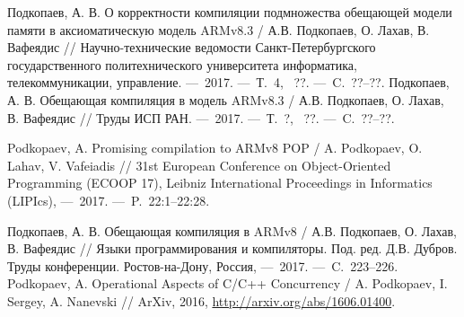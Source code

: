 \renewcommand{\refname}{Статьи из ``Перечня рецензируемых научных изданий, в которых должны быть опубликованы основные научные результаты диссертаций на соискание ученой степени кандидата наук, на соискание ученой степени доктора наук'', сформированного согласно требованиям, установленным Министерством образования и науки Российской Федерации}
\begin{thebibliography}{99}
 Подкопаев, А. В. О корректности компиляции подмножества обещающей модели памяти в аксиоматическую модель ARMv8.3 / А.В. Подкопаев, О. Лахав, В. Вафеядис // Научно-технические ведомости Санкт-Петербургского государственного политехнического университета информатика, телекоммуникации, управление. ---~2017. ---~Т.~4, \textnumero~??. ---~C.~??--??.
 Подкопаев, А. В. Обещающая компиляция в модель ARMv8.3 / А.В. Подкопаев, О. Лахав, В. Вафеядис // Труды ИСП РАН. ---~2017. ---~Т.~?, \textnumero~??. ---~C.~??--??.
\setcounter{firstbib}{\value{enumiv}}
\end{thebibliography}

\renewcommand{\refname}{Статьи в изданиях, входящих в базы цитирования Web of Science и SCOPUS}
\begin{thebibliography}{99}
\setcounter{enumiv}{\value{firstbib}}
 Podkopaev, A. Promising compilation to ARMv8 POP / A. Podkopaev, O. Lahav, V. Vafeiadis // 31st European Conference on Object-Oriented Programming (ECOOP 17), Leibniz International Proceedings in Informatics (LIPIcs),  ---~2017. ---~P.~22:1--22:28.
\setcounter{firstbib}{\value{enumiv}}
\end{thebibliography}

\renewcommand{\refname}{Статьи в других изданиях}
\begin{thebibliography}{99}
\setcounter{enumiv}{\value{firstbib}}
 Подкопаев, А. В. Обещающая компиляция в ARMv8 / А.В. Подкопаев, О. Лахав, В. Вафеядис // Языки программирования и компиляторы. Под. ред. Д.В. Дубров. Труды конференции. Ростов-на-Дону, Россия, ---~2017. ---~C.~223--226.
 Podkopaev, A. Operational Aspects of {C/C++} Concurrency / A. Podkopaev, I. Sergey, A. Nanevski // ArXiv, 2016, 
  \url{http://arxiv.org/abs/1606.01400}.
\end{thebibliography}
